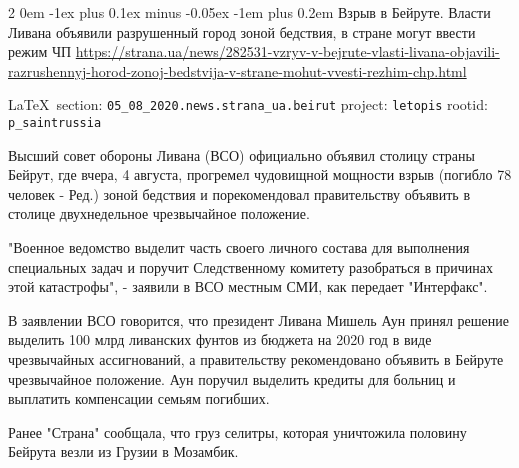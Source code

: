 \documentclass[a4paper,11pt]{extreport}
\makeatletter
\renewcommand\subsection{%
  \clearpage
    \@startsection{subsection}%
    {2}%
    {0em}%
    {-1ex plus 0.1ex minus -0.05ex}%
    {-1em plus 0.2em}%
    {\scshape\bfseries\Large}%
}
\makeatother
\begin{document}
 
 
\subsection{Взрыв в Бейруте. Власти Ливана объявили разрушенный город зоной бедствия, в стране могут ввести режим ЧП}
\label{sec:05_08_2020.news.strana_ua.beirut}
\url{https://strana.ua/news/282531-vzryv-v-bejrute-vlasti-livana-objavili-razrushennyj-horod-zonoj-bedstvija-v-strane-mohut-vvesti-rezhim-chp.html}
  
\vspace{0.5cm}
{\ifDEBUG\small\LaTeX~section: \verb|05_08_2020.news.strana_ua.beirut| project: \verb|letopis| rootid: \verb|p_saintrussia|\fi}
\vspace{0.5cm}


Высший совет обороны Ливана (ВСО) официально объявил столицу страны Бейрут, где
вчера, 4 августа, прогремел чудовищной мощности взрыв (погибло 78 человек -
Ред.) зоной бедствия и порекомендовал правительству объявить в столице
двухнедельное чрезвычайное положение.

"Военное ведомство выделит часть своего личного состава для выполнения
специальных задач и поручит Следственному комитету разобраться в причинах этой
катастрофы", - заявили в ВСО  местным СМИ, как передает "Интерфакс".

В заявлении ВСО говорится, что президент Ливана Мишель Аун принял решение
выделить 100 млрд ливанских фунтов из бюджета на 2020 год в виде чрезвычайных
ассигнований, а правительству рекомендовано объявить в Бейруте чрезвычайное
положение. Аун поручил выделить кредиты для больниц и выплатить компенсации
семьям погибших.

Ранее "Страна" сообщала, что груз селитры, которая уничтожила половину Бейрута
везли из Грузии в Мозамбик.
  

  
 
 
\end{document}
